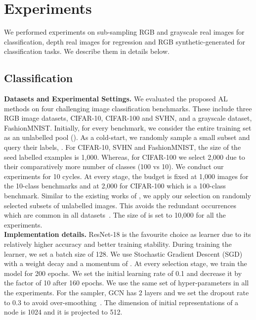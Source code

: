 \section{Experiments}
\label{experiments}
We performed experiments on sub-sampling RGB and grayscale real images for classification,
depth real images for regression and RGB synthetic-generated for classification tasks. We describe them in details below.
\subsection{Classification}
\noindent \textbf{Datasets and Experimental Settings.} 
We evaluated the proposed AL methods on four challenging image classification 
benchmarks. These include three RGB image datasets, CIFAR-10\cite{cifar}, CIFAR-100\cite{cifar} and SVHN\cite{Goodfellow2014Multi-digitNetworks},
and a grayscale dataset, FashionMNIST\cite{Xiao2017Fashion-MNIST:Algorithms}.
Initially, for every benchmark, we consider the entire training set as an unlabelled pool (). As a cold-start, we randomly sample a small subset and query their labels, . 
For CIFAR-10, SVHN and FashionMNIST, the size of the seed labelled examples is 1,000. Whereas, for CIFAR-100 we select 2,000
due to their comparatively more number of classes (100 vs 10). 
We conduct our experiments for 10 cycles. At every stage, the budget is fixed at
1,000 images for the 10-class benchmarks and at 2,000
for CIFAR-100 which is a 100-class benchmark. 
Similar to the existing works of \cite{BeluchBcai2018TheClassification,Yoo2019LearningLearning},
we apply our selection on randomly selected subsets  
of unlabelled images. This avoids the redundant occurrences which are common in all datasets~\cite{data_redundant}. The size of  is set to 10,000 for all the experiments.
\\
\noindent \textbf{Implementation details.} 
ResNet-18 \cite{he2016deep}  is the favourite choice as learner due to its relatively  
higher accuracy and better training stability.
During training the learner, we set a batch size of 128. We use Stochastic Gradient Descent (SGD) 
with a weight decay  and a momentum of . At every selection stage, we train the model for
200 epochs. We set the initial learning rate of 0.1 and decrease it by the factor of 10 after 160 epochs. 
We use the same set of hyper-parameters in all the experiments. 
For the sampler, GCN has 2 layers and we set the dropout rate to 0.3 to avoid over-smoothing~\cite{zhao2019pairnorm}.
The dimension of initial representations of a node is 1024 and it is projected to 512.
